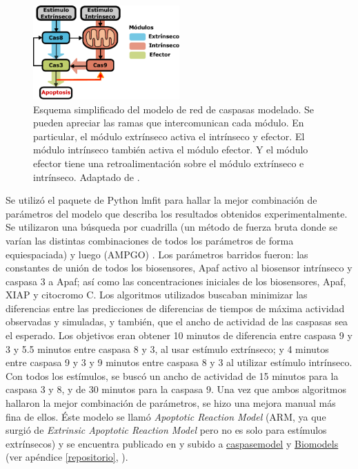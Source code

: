 \begin{figure}
    \centering
    \includegraphics[width=0.5\textwidth]{img/cap_4/model_simplified.pdf}
    \caption{\footnotesize{Esquema simplificado del modelo de red de caspasas modelado. Se pueden apreciar las ramas que intercomunican cada módulo. En particular, el módulo extrínseco activa el intrínseco y efector. El módulo intrínseco también activa el módulo efector. Y el módulo efector tiene una retroalimentación sobre el módulo extrínseco e intrínseco. Adaptado de \cite{Corbat2021}.}}
    \label{fig:sketch_2021}
\end{figure}

Se utilizó el paquete de Python lmfit \citep{newville_2014} para hallar la mejor combinación de parámetros del modelo que describa los resultados obtenidos experimentalmente. Se utilizaron una búsqueda por cuadrilla (un método de fuerza bruta donde se varían las distintas combinaciones de todos los parámetros de forma equiespaciada) y luego  (AMPGO) \citep{Lasdon2010}. Los parámetros barridos fueron: las constantes de unión de todos los biosensores, Apaf activo al biosensor intrínseco y caspasa 3 a Apaf; así como las concentraciones iniciales de los biosensores, Apaf, XIAP y citocromo C. Los algoritmos utilizados buscaban minimizar las diferencias entre las predicciones de diferencias de tiempos de máxima actividad observadas y simuladas, y también, que el ancho de actividad de las caspasas sea el esperado. Los objetivos eran obtener 10 minutos de diferencia entre caspasa 9 y 3 y 5.5 minutos entre caspasa 8 y 3, al usar estímulo extrínseco; y 4 minutos entre caspasa 9 y 3 y 9 minutos entre caspasa 8 y 3 al utilizar estímulo intrínseco. Con todos los estímulos, se buscó un ancho de actividad de 15 minutos para la caspasa 3 y 8, y de 30 minutos para la caspasa 9. Una vez que ambos algoritmos hallaron la mejor combinación de parámetros, se hizo una mejora manual más fina de ellos. Éste modelo se llamó \textit{Apoptotic Reaction Model} (ARM, ya que surgió de \textit{Extrinsic Apoptotic Reaction Model} pero no es solo para estímulos extrínsecos) y se encuentra publicado en \cite{Corbat2021} y subido a \href{https://github.com/acorbat/caspase_model/tree/master}{caspase\textunderscore model} y \href{https://www.ebi.ac.uk/biomodels/MODEL2105210001}{Biomodels}  (ver apéndice \ref{repositorio}, \cite{Malik-Sheriff2018}).


